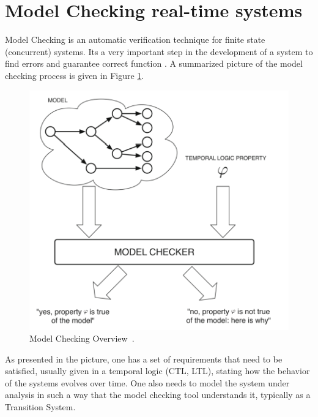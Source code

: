 


\section{Model Checking real-time systems}

Model Checking is an automatic verification technique for finite state (concurrent) systems. Its a very important step in the development of a system to find errors and guarantee correct function \cite{Baier2008}. A summarized picture of the model checking process is given in Figure \ref{fig:modelchecking_flow}.


\begin{figure} [H]
    \centering
    \includegraphics[width=0.75\linewidth]{chapters/checker_over.png}
    \caption[Model Checking Overview]{Model Checking Overview~\cite{Abate2021}.}
    \label{fig:modelchecking_flow}
\end{figure}


As presented in the picture, one has a set of requirements that need to be satisfied, usually given in a temporal logic (CTL, LTL), stating how the behavior of the systems evolves over time. One also needs to model the system under analysis in such a way that the model checking tool understands it, typically as a Transition System. 

